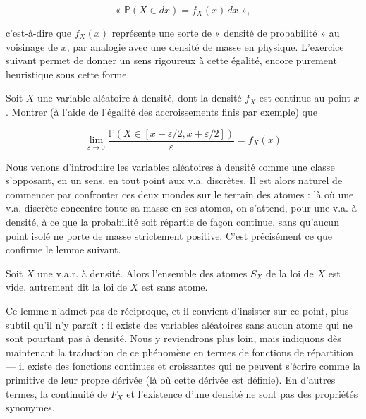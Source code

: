 $$
\text{« } \mathbb{P}(X \in dx) = f_X(x)\, dx \text{ »},
$$

c'est-à-dire que $f_X(x)$ représente une sorte de « densité de probabilité » au voisinage de $x$, par analogie avec une densité de masse en physique. L'exercice suivant permet de donner un sens rigoureux à cette égalité, encore purement heuristique sous cette forme.

\begin{exercice}
Soit $X$ une variable aléatoire à densité, dont la densité $f_X$ est continue au point $x$. Montrer (à l'aide de l'égalité des accroissements finis par exemple) que

$$
\lim_{\varepsilon \to 0} \frac{\mathbb{P}(X \in [x - \varepsilon/2, x + \varepsilon/2])}{\varepsilon} = f_X(x)
$$
\end{exercice}

\newpage

























Nous venons d'introduire les variables aléatoires à densité comme une classe s'opposant, en un sens, en tout point aux v.a. discrètes. Il est alors naturel de commencer par confronter ces deux mondes sur le terrain des atomes : là où une v.a. discrète concentre toute sa masse en ses atomes, on s'attend, pour une v.a. à densité, à ce que la probabilité soit répartie de façon continue, sans qu'aucun point isolé ne porte de masse strictement positive. C'est précisément ce que confirme le lemme suivant.

\medskip

\begin{mdframed}
\begin{lemme}
Soit $X$ une v.a.r. à densité. Alors l'ensemble des atomes $S_X$ de la loi de $X$ est vide, autrement dit la loi de $X$ est sans atome.
\end{lemme}
\end{mdframed}

Ce lemme n'admet pas de réciproque, et il convient d'insister sur ce point, plus subtil qu'il n'y paraît : il existe des variables aléatoires sans aucun atome qui ne sont pourtant pas à densité. Nous y reviendrons plus loin, mais indiquons dès maintenant la traduction de ce phénomène en termes de fonctions de répartition — il existe des fonctions continues et croissantes qui ne peuvent s'écrire comme la primitive de leur propre dérivée (là où cette dérivée est définie). En d'autres termes, la continuité de $F_X$ et l'existence d'une densité ne sont pas des propriétés synonymes.

